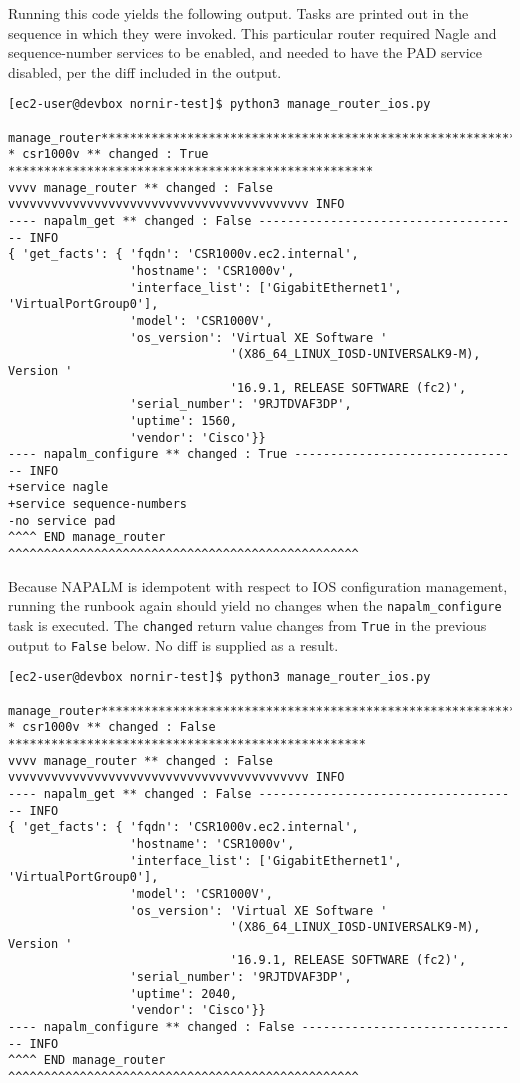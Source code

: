Running this code yields the following output. Tasks are printed out in the
sequence in which they were invoked. This particular router required Nagle and
sequence-number services to be enabled, and needed to have the PAD service
disabled, per the diff included in the output.

\begin{verbatim}
[ec2-user@devbox nornir-test]$ python3 manage_router_ios.py

manage_router***********************************************************
* csr1000v ** changed : True ***************************************************
vvvv manage_router ** changed : False vvvvvvvvvvvvvvvvvvvvvvvvvvvvvvvvvvvvvvvvvv INFO
---- napalm_get ** changed : False ------------------------------------- INFO
{ 'get_facts': { 'fqdn': 'CSR1000v.ec2.internal',
                 'hostname': 'CSR1000v',
                 'interface_list': ['GigabitEthernet1', 'VirtualPortGroup0'],
                 'model': 'CSR1000V',
                 'os_version': 'Virtual XE Software '
                               '(X86_64_LINUX_IOSD-UNIVERSALK9-M), Version '
                               '16.9.1, RELEASE SOFTWARE (fc2)',
                 'serial_number': '9RJTDVAF3DP',
                 'uptime': 1560,
                 'vendor': 'Cisco'}}
---- napalm_configure ** changed : True -------------------------------- INFO
+service nagle
+service sequence-numbers
-no service pad
^^^^ END manage_router ^^^^^^^^^^^^^^^^^^^^^^^^^^^^^^^^^^^^^^^^^^^^^^^^^
\end{verbatim}

Because NAPALM is idempotent with respect to IOS configuration management,
running the runbook again should yield no changes when the
\verb|napalm_configure| task is executed. The \verb|changed| return value
changes from \verb|True| in the previous output to \verb|False| below. No diff
is supplied as a result.

\begin{verbatim}
[ec2-user@devbox nornir-test]$ python3 manage_router_ios.py

manage_router***********************************************************
* csr1000v ** changed : False **************************************************
vvvv manage_router ** changed : False vvvvvvvvvvvvvvvvvvvvvvvvvvvvvvvvvvvvvvvvvv INFO
---- napalm_get ** changed : False ------------------------------------- INFO
{ 'get_facts': { 'fqdn': 'CSR1000v.ec2.internal',
                 'hostname': 'CSR1000v',
                 'interface_list': ['GigabitEthernet1', 'VirtualPortGroup0'],
                 'model': 'CSR1000V',
                 'os_version': 'Virtual XE Software '
                               '(X86_64_LINUX_IOSD-UNIVERSALK9-M), Version '
                               '16.9.1, RELEASE SOFTWARE (fc2)',
                 'serial_number': '9RJTDVAF3DP',
                 'uptime': 2040,
                 'vendor': 'Cisco'}}
---- napalm_configure ** changed : False ------------------------------- INFO
^^^^ END manage_router ^^^^^^^^^^^^^^^^^^^^^^^^^^^^^^^^^^^^^^^^^^^^^^^^^
\end{verbatim}

